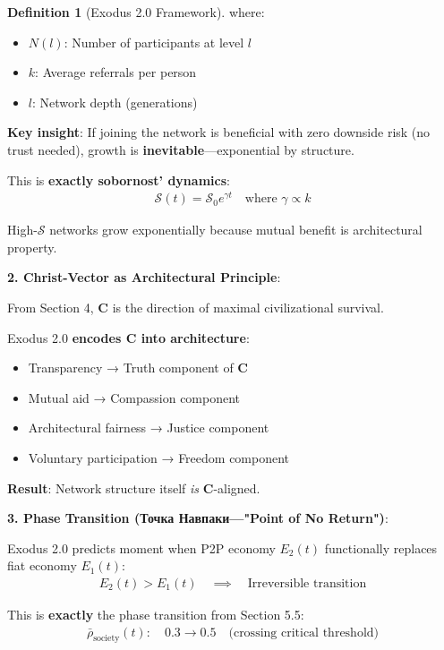 \documentclass[11pt,a4paper]{article}
\theoremstyle{definition}
\newtheorem{definition}{Definition}[section]
\theoremstyle{remark}
\begin{document}
\begin{small}
\begin{enumerate}
\begin{definition}[Exodus 2.0 Framework]
where:
\begin{itemize}
    \item \(N(l)\): Number of participants at level \(l\)
    \item \(k\): Average referrals per person
    \item \(l\): Network depth (generations)
\end{itemize}

\textbf{Key insight}: If joining the network is beneficial with zero downside risk (no trust needed), growth is \textbf{inevitable}—exponential by structure.

This is \textbf{exactly sobornost' dynamics}:
\begin{align}
\mathcal{S}(t) = \mathcal{S}_0 e^{\gamma t} \quad \text{where } \gamma \propto k
\end{align}

High-\(\mathcal{S}\) networks grow exponentially because mutual benefit is architectural property.

\textbf{2. Christ-Vector as Architectural Principle}:

From Section 4, \(\mathbf{C}\) is the direction of maximal civilizational survival.

Exodus 2.0 \textbf{encodes \(\mathbf{C}\) into architecture}:
\begin{itemize}
    \item Transparency → Truth component of \(\mathbf{C}\)
    \item Mutual aid → Compassion component
    \item Architectural fairness → Justice component
    \item Voluntary participation → Freedom component
\end{itemize}

\textbf{Result}: Network structure itself \textit{is} \(\mathbf{C}\)-aligned.

\textbf{3. Phase Transition (Точка Навпаки—"Point of No Return")}:

Exodus 2.0 predicts moment when P2P economy \(E_2(t)\) functionally replaces fiat economy \(E_1(t)\):
\begin{align}
E_2(t) > E_1(t) \quad \implies \quad \text{Irreversible transition}
\end{align}

This is \textbf{exactly} the phase transition from Section 5.5:
\begin{align}
\bar{\rho}_{\text{society}}(t) : \quad 0.3 \to 0.5 \quad \text{(crossing critical threshold)}
\end{align}


\end{definition}
\end{enumerate}
\end{small}
\end{document}
